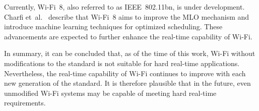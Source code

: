 Currently, Wi-Fi~8, also referred to as IEEE~802.11bn, is under development.  
Charfi et~al.~\cite[p.~1]{CHARFI2025111590} describe that Wi-Fi~8 aims to improve the \ac{MLO} mechanism and introduce machine learning techniques for optimized scheduling.  
These advancements are expected to further enhance the real-time capability of Wi-Fi.  

In summary, it can be concluded that, as of the time of this work, Wi-Fi without modifications to the standard is not suitable for hard real-time applications.  
Nevertheless, the real-time capability of Wi-Fi continues to improve with each new generation of the standard.  
It is therefore plausible that in the future, even unmodified Wi-Fi systems may be capable of meeting hard real-time requirements.  


